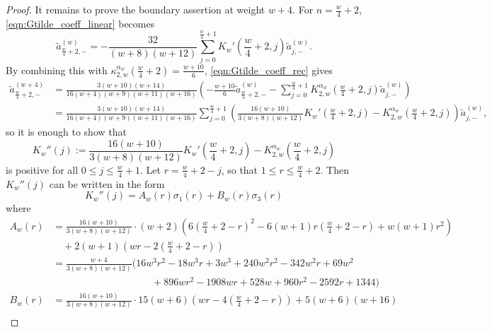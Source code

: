 \documentclass[10pt,reqno]{amsproc}
\newcommand{\1}{\mathds{1}}	%
\theoremstyle{definition}
\theoremstyle{remark}
\begin{document}
\begin{proof}
    It remains to prove the boundary assertion at weight $w+4$.
    For $n = \frac{w}{4} + 2$, \eqref{eqn:Gtilde_coeff_linear} becomes
    \begin{equation}
        \tilde{a}_{\frac{w}{4}+2,-}^{(w)} = - \frac{32}{(w+8)(w+12)} \sum_{j=0}^{\frac{w}{4}+1} K_w'\left(\frac{w}{4}+2,j\right) \tilde{a}_{j,-}^{(w)}.
    \end{equation}
    By combining this with $\kappa_{2,w}^{\alpha_w}\left(\frac{w}{4}+2\right) = \frac{w+10}{6}$, \eqref{eqn:Gtilde_coeff_rec} gives
    \begin{align*}
        \tilde{a}_{\frac{w}{4}+2,-}^{(w+4)} &= \frac{3(w+10)(w+14)}{16(w+4)(w+9)(w+11)(w+16)} \left(-\frac{w+10}{6} \tilde{a}_{\frac{w}{4}+2,-}^{(w)} - \sum_{j=0}^{\frac{w}{4}+1} K_{2,w}^{\alpha_w}\left(\frac{w}{4}+2,j\right) \tilde{a}_{j,-}^{(w)}\right) \\
        &= \frac{3(w+10)(w+14)}{16(w+4)(w+9)(w+11)(w+16)} \sum_{j=0}^{\frac{w}{4}+1} \left(\frac{16(w+10)}{3(w+8)(w+12)} K_w' \left(\frac{w}{4}+2,j\right) - K_{2,w}^{\alpha_w}\left(\frac{w}{4}+2,j\right)\right) \tilde{a}_{j,-}^{(w)},
    \end{align*}
    so it is enough to show that
    \begin{equation}
        \label{eqn:Kprime2}
        K_w''(j) := \frac{16(w+10)}{3(w+8)(w+12)} K_w' \left(\frac{w}{4}+2,j\right) - K_{2,w}^{\alpha_w}\left(\frac{w}{4}+2,j\right)
    \end{equation}
    is positive for all $0 \le j \le \frac{w}{4} + 1$.
    Let $r = \frac{w}{4} + 2 - j$, so that $1 \le r \le \frac{w}{4} + 2$.
    Then $K_w''(j)$ can be written in the form
    \begin{equation}
        K_w''(j) = A_w(r) \sigma_1(r) + B_w(r) \sigma_3(r)
    \end{equation}
    where
    \begin{align}
        A_w(r) &= \frac{16(w+10)}{3(w+8)(w+12)}\cdot (w+2)\left(6\left(\frac{w}{4}+2-r\right)^2 - 6(w + 1) r\left(\frac{w}{4}+2-r\right) + w(w+1) r^2\right) \nonumber \\
        &\quad+ 2(w+1)\left(wr- 2\left(\frac{w}{4}+2-r\right)\right) \nonumber \\
        &= \frac{w+4}{3(w+8)(w+12)} (16w^3r^2 - 18w^3 r + 3w^3 + 240 w^2 r^2 - 342 w^2r + 69w^2 \nonumber \\
        &\qquad\qquad\qquad\qquad\qquad + 896wr^2 - 1908 wr + 528 w + 960r^2 - 2592r + 1344) \label{eqn:Aw} \\
        B_w(r) &= \frac{16(w+10)}{3(w+8)(w+12)} \cdot 15(w+6)\left(wr-4\left(\frac{w}{4}+2-r\right)\right) + 5(w+6)(w+16) \nonumber \\

\end{align}
\end{proof}
\end{document}
